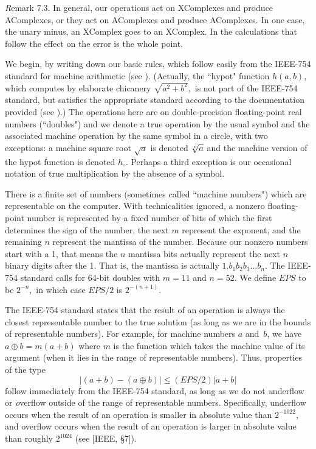 {\textit Remark} 7.3.
In general,  our operations  act on XComplexes and produce AComplexes, or they act on AComplexes and produce
 AComplexes.  In one case, the unary minus, an XComplex goes to an XComplex.  
In the calculations that follow the effect on the error is the whole point.

\begin{conventions}\label{GMT 7.4}
We begin, by writing down our basic rules, which follow easily from the IEEE-754 standard for machine arithmetic (see \cite{IEEE}).
(Actually,  the ``hypot" function $h(a,b)$, which computes by elaborate chicanery $\sqrt{a^2 + b^2},$ is not part of the IEEE-754 standard, but  satisfies the appropriate standard according to the documentation provided (see \cite{K1}).)  The operations here are on
double-precision floating-point real numbers (``doubles") and we denote a true operation by the usual symbol and the associated machine operation by the same symbol in a circle, with two exceptions: a machine square root $\sqrt a$ is denoted $\root o \of a$ and the machine version of the hypot function is denoted $h_\circ$.  Perhaps a third exception is our occasional notation of true multiplication by the absence of a symbol.  

There is a finite set of numbers (sometimes called ``machine numbers") which are representable on the computer.  With
technicalities ignored,    a nonzero floating-point number is represented by a fixed number of bits of which
the first determines the sign of the number, the next $m$ represent the exponent, and the remaining $n$ represent the
mantissa of the number.  Because our nonzero numbers start with a 1, that means the $n$ mantissa bits actually represent
the next
$n$ binary digits after the 1.  That is, the mantissa is actually $1.b_1b_2b_3...b_{n}.$   The IEEE-754 standard calls for
64-bit doubles with $m = 11$ and $n = 52.$  We define $EPS$ to be $2^{-n},$ in which case $EPS/2$ is $2^{-(n + 1)}.$  

The IEEE-754 standard states that the result of an operation
 is always the closest representable number to the true solution (as long as we are in the bounds of representable
numbers).  For example, for machine numbers $a$ and~$b$, we have $a \oplus b = m(a+b)$ where $m$ is the function which
takes the machine value of its argument (when it lies in the range of representable numbers).  Thus, properties of the type
$$|(a + b) - (a \oplus b)| \leq (EPS/2) |a + b|$$
follow immediately from the IEEE-754 standard, as long as we do not {\textit underflow} or {\textit overflow} outside of the range of representable numbers. 
Specifically, underflow occurs when the result of an operation is smaller in absolute value than $2^{-1022}$,
 and overflow occurs when the result of an operation is larger in absolute value than roughly $2^{1024}$
 (see [IEEE, \S 7]).
\end{conventions}

